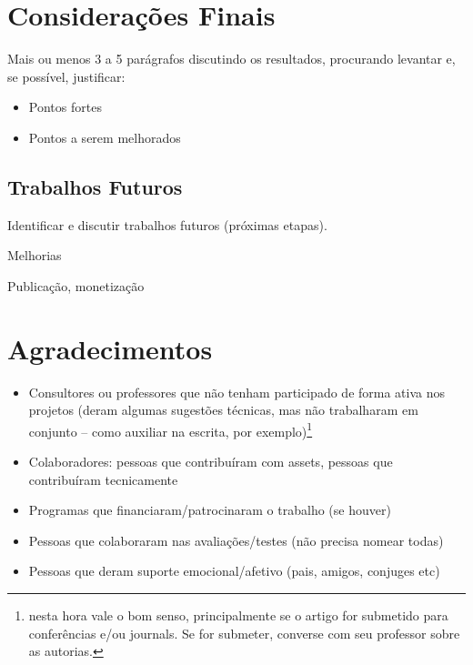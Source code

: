 \section{Considerações Finais}
\label{secao:consideracoes_finais}
Mais ou menos 3 a 5 parágrafos discutindo os resultados, procurando levantar e, se possível, justificar:

\begin{itemize}
    \item Pontos fortes 
    \item Pontos a serem melhorados
\end{itemize}

\subsection{Trabalhos Futuros}
Identificar e discutir trabalhos futuros (próximas etapas).

Melhorias

Publicação, monetização


\section*{Agradecimentos}

\begin{itemize}
    \item Consultores ou professores que não tenham participado de forma ativa nos projetos (deram
algumas sugestões técnicas, mas não trabalharam em conjunto – como auxiliar na escrita, por exemplo)\footnote{nesta hora vale o bom senso, principalmente se o artigo for submetido para conferências e/ou journals. Se for submeter, converse com seu professor sobre as autorias.}
    \item Colaboradores: pessoas que contribuíram com assets, pessoas que contribuíram tecnicamente
    \item Programas que financiaram/patrocinaram o trabalho (se houver)
    \item Pessoas que colaboraram nas avaliações/testes (não precisa nomear todas) 
    \item Pessoas que deram suporte emocional/afetivo (pais, amigos, conjuges etc)
\end{itemize}